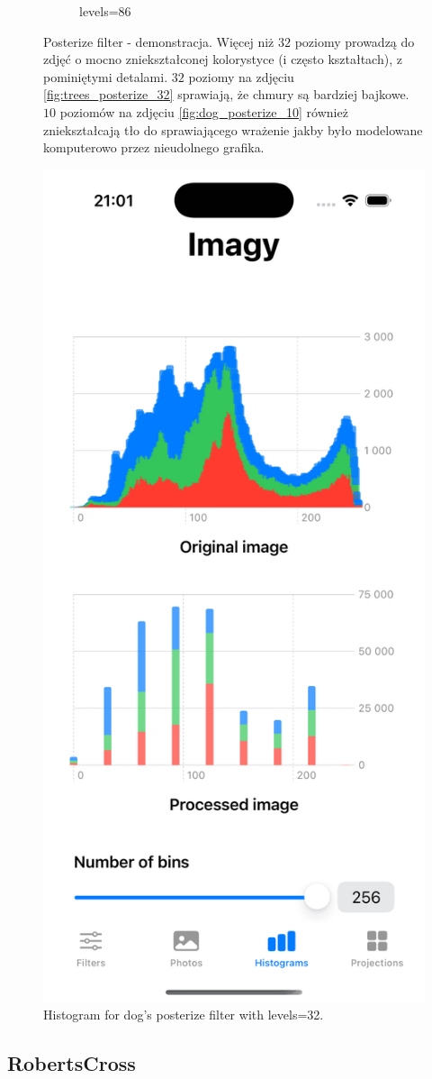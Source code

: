 \documentclass[a4paper]{article}
\begin{document}
\begin{figure}[H]
\begin{subfigure}{0.2\textwidth}
        \caption{levels=86}
        \label{fig:trees_posterize_86}
    \end{subfigure}
    \caption{Posterize filter - demonstracja. Więcej niż $32$ poziomy prowadzą do zdjęć o mocno zniekształconej kolorystyce (i często kształtach), z pominiętymi detalami. $32$ poziomy na zdjęciu \ref{fig:trees_posterize_32} sprawiają, że chmury są bardziej bajkowe. $10$ poziomów na zdjęciu \ref{fig:dog_posterize_10} również zniekształcają tło do sprawiającego wrażenie jakby było modelowane komputerowo przez nieudolnego grafika.}
    \label{fig:posterize}
\end{figure}

\begin{figure}[H]
    \centering
    \includegraphics[width=0.25\linewidth]{images/dop_posterize_32_histogram.png}
    \caption{Histogram for dog's posterize filter with levels=32.}
    \label{fig:dop_posterize_32_histogram}
\end{figure}

\subsection{RobertsCross}
\end{document}

